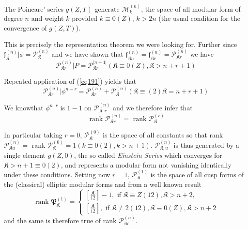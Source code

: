 \begin{thm}\label{chap11:thm14}%
The Poincare' series $g(Z, T)$ generate
$\mathscr{M}_k^{(n)}$, the space of all modular form of degree
 $n$ and weight $k$ provided $k \equiv 0(Z)$, $k >
2n$ (the usual condition for the convergence of $g(Z, T)$). 
\end{thm}

This is precisely the representation theorem we were looking
for. Further since $\mathfrak{f}_\mathfrak{K}^{(n)}|
\phi=\mathscr{P}^{(n)}_\mathfrak{K}$ and we have shown that
$\mathfrak{f}_{\mathfrak{K}n}^{(n)} = \mathfrak{f}^{(n)}_{\mathfrak{K}
r} = \mathscr{P}_{\mathfrak{K}r}^{(n)}$ we have  
\begin{equation*}
\mathscr{P}_{\mathfrak{K}r}^{(n)}| P =
\mathscr{P}_{\mathfrak{K}r}^{|n-1|}(\mathfrak{K} \equiv 
0(Z),\mathfrak{K}>n+r+1) \tag{191}\label{eq191}   
\end{equation*}

Repeated application of (\ref{eq191}) yields that
$$
\mathscr{P}^{(n)}_{\mathfrak{K}r} | \phi^{n-r} =
\mathscr{P}^{(n)}_{\mathfrak{K}r} + \mathscr{P}^{(n)}_{\mathfrak{K}}
(\mathfrak{K} \equiv (2) \mathfrak{K} = n + r+1)
$$

We know\pageoriginale that $\phi^{n \cdot r}$ is $1-1$ on
$\mathscr{P}_{\mathfrak{K},r}^{(n)}$  and we therefore infer that  
$$
\text { rank } \mathscr{P}_{\mathfrak{K}r}^{(n)}= \text{ rank }
\mathscr{P}_\mathfrak{K}^{(r)} 
$$

In particular taking $r=0$, $\mathscr{P}_\mathfrak{K}^{(0)}$ is the
space of all constants so that rank
$\mathscr{P}^{(n)}_{\mathfrak{K}u}=$ rank
$\mathscr{P}_\mathfrak{K}^{(0)}=1  (k  
\equiv 0(2), k> n+1)$.  $\mathscr{P}_{\mathfrak{K}, u}^{(n)}$ is
thus generated by a 
single element $g(Z, 0)$, the so called \textit{Einstein Series}
which converges for $\mathfrak{K} > n+1 \equiv 0(2)$, and represents a
modular form not vanishing identically under these conditions. Setting now
$r=1$, $\mathscr{P}_\mathfrak{K}^{(1)}$ is the space of all cusp forms
of the (classical) elliptic modular forms and from a well known result  
$$
\text{ rank } \mathfrak{P}^{(1)}_\mathfrak{K}=
\begin{cases}
\left[\frac{\mathfrak{K}}{12} \right]-1, \text{ if } \mathfrak{K}
\equiv Z (12), \mathfrak{K}>n+2,  \\ 
\left[\frac{\mathfrak{K}}{12} \right], \text{ if } \mathfrak{K} \neq 2(12),
\mathfrak{K} \equiv 0(Z),\mathfrak{K}>n+2  
\end{cases}
$$
and the same is therefore true of rank $\mathscr{P}_{\mathfrak{K} l}^{(n)}$.


